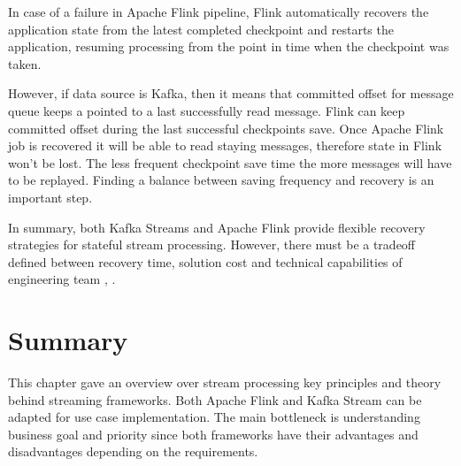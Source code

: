 \begin{description}
    In case of a failure in Apache Flink pipeline, Flink automatically recovers the application
    state from the latest completed checkpoint and restarts the application,
    resuming processing from the point in time when the checkpoint was taken.

    However, if data source is Kafka, then it means that committed offset for message queue
    keeps a pointed to a last successfully read message.
    Flink can keep committed offset during the last successful checkpoints save.
    Once Apache Flink job is recovered it will be able to read staying messages,
    therefore state in Flink won't be lost.
    The less frequent checkpoint save time the more messages will have to be replayed.
    Finding a balance between saving frequency and recovery is an important step.

\end{description}

In summary, both Kafka Streams and Apache Flink provide flexible recovery strategies
for stateful stream processing.
However, there must be a tradeoff defined between recovery time, solution cost and
technical capabilities of engineering team \cite{flinkCheckpoints}, \cite{flink_checkpoints_flink}.


\section{Summary}\label{sec:summary}
This chapter gave an overview over stream processing key principles and theory behind
streaming frameworks.
Both Apache Flink and Kafka Stream can be adapted for use case implementation.
The main bottleneck is understanding business goal and priority since both
frameworks have their advantages and disadvantages depending on the requirements.
